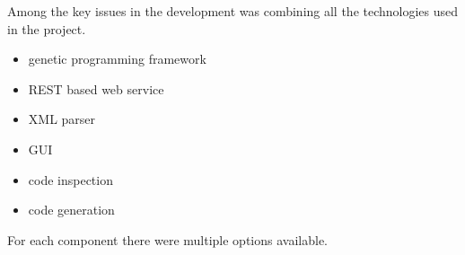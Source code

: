 Among the key issues in the development was combining all the technologies used in the project.
\begin{itemize}
\item genetic programming framework
\item REST based web service
\item XML parser
\item GUI
\item code inspection
\item code generation
\end{itemize}
For each component there were multiple options available.